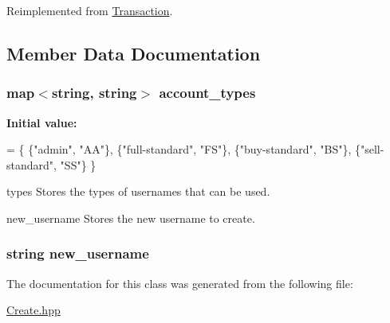 Reimplemented from \hyperlink{class_transaction_a8e5996ad33eb07eef44f55deba6c298e}{Transaction}.



\subsection{Member Data Documentation}
\hypertarget{class_create_aa1c31e633ab706568edf84799ed3ca54}{
\subsubsection[{account\-\_\-types}]{\setlength{\rightskip}{0pt plus 5cm}map$<$string, string$>$ account\-\_\-types\hspace{0.3cm}{\ttfamily [private]}}}\label{class_create_aa1c31e633ab706568edf84799ed3ca54}
{\bfseries Initial value\-:}
\begin{DoxyCode}
= \{
            \{\textcolor{stringliteral}{"admin"}, \textcolor{stringliteral}{"AA"}\},
            \{\textcolor{stringliteral}{"full-standard"}, \textcolor{stringliteral}{"FS"}\},
            \{\textcolor{stringliteral}{"buy-standard"}, \textcolor{stringliteral}{"BS"}\},
            \{\textcolor{stringliteral}{"sell-standard"}, \textcolor{stringliteral}{"SS"}\}
    \}
\end{DoxyCode}


types Stores the types of usernames that can be used. 

new\-\_\-username Stores the new username to create. \hypertarget{class_create_a19ae5348081200db2e186a7045be5112}{
\subsubsection[{new\-\_\-username}]{\setlength{\rightskip}{0pt plus 5cm}string new\-\_\-username\hspace{0.3cm}{\ttfamily [private]}}}\label{class_create_a19ae5348081200db2e186a7045be5112}


The documentation for this class was generated from the following file\-:\begin{DoxyCompactItemize}
\item 
\hyperlink{_create_8hpp}{Create.\-hpp}\end{DoxyCompactItemize}
